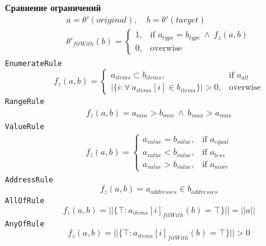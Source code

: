 \documentclass[12pt]{report}
\def\code#1{\colorbox{light-gray}{\texttt{#1}}}
\begin{document}
\textbf{Сравнение ограничений}
\begin{equation}
\begin{aligned}
a = \theta'(original), \quad b = \theta'(target) \\
\theta'_{fitWith}(b) = \begin{cases}
	1, & \text{if } a_{type} = b_{type} \ \wedge \ f_z(a, b) \\
	0, & \text{overwise}
\end{cases}
\end{aligned}
\end{equation}
\code{EnumerateRule}
\begin{equation}
f_z(a, b) = \begin{cases}
	a_{items} \subset b_{items}, & \text{if } a_{all} \\
	|\{i: \forall \ a_{items}[i] \in b_{items}\}|> 0, & \text{overwise}
\end{cases}
\end{equation}
\code{RangeRule}
\begin{equation}
\begin{aligned}
f_z(a, b) = a_{min} > b_{min} \ \wedge \ b_{max} > a_{max}
\end{aligned}
\end{equation}
\code{ValueRule}
\begin{equation}
\begin{aligned}
f_z(a, b) = \begin{cases}
	a_{value} = b_{value}, & \text{if } a_{equal} \\
	a_{value} < b_{value}, & \text{if } a_{less} \\
	a_{value} > b_{value}, & \text{if } a_{more}
\end{cases}
\end{aligned}
\end{equation}
\code{AddressRule}
\begin{equation}
f_z(a, b) = a_{addresses} \in b_{addresses}
\end{equation}
\code{AllOfRule}
\begin{equation}
f_z(a, b) = ||\{\top: a_{items}[i]_{fitWith}(b) = \top\}|| = ||a||
\end{equation}
\code{AnyOfRule}
\begin{equation}
f_z(a, b) = ||\{\top: a_{items}[i]_{fitWith}(b) = \top\}|| > 0
\end{equation}
\end{document}
